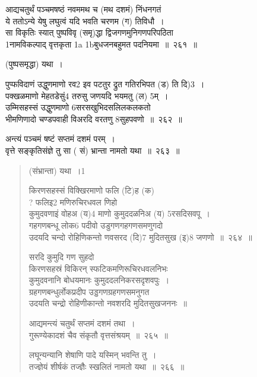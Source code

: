 \documentclass[11pt, openany]{book}
\begin{document}
\begin{quote}

\end{quote}
{\na आद्यचतुर्थं पञ्चमषष्ठं नवममथ च (मथ दशमं) निंधनगतं \\
ये ततोऽन्ये येषु लघुत्वं यदि भवति चरणम (ग) तिविधौ~।\\
सा विकृतिः स्यात् पुष्पविवृ (समृ)द्धा द्विजगणमुनिगणपरिपठिता\\
1नामविकल्पाद् वृत्तकृता 1a 1bबुधजनबहुमत पदनियमा~॥~२६१~॥}

(पुष्पसमृद्धा) यथा~। 

{\na पुप्फविदाणं उद्धुणमाणो रव2 इव पटतुर द्रुत गतिरभिपत (ड) ति दि)3~। \\
पक्खळमाणो मेहतडेसुं4 तरुसु जणयदि भयमतु (ल) 5म्~।\\
उम्मिसहस्सं उद्धुणमाणो 6सरसखुभिदसलिलकलकतो\\
भीमणिणादो चण्डपवाही विअरदि वरतणु 8सुहपवणो~॥~२६२~॥}

{} 

{\na अन्त्यं पञ्चमं षष्टं सप्तमं दशमं परम्~।\\
वृत्ते सङ्कृतिसंज्ञे तु सा ( सं) भ्रान्ता नामतो यथा~॥~२६३~॥}


\newpage

\begin{quote}
(संभ्रान्ता) यथा~।1 

{\na किरणसहस्सं विक्खिरमाणो फलि (टि)ह (क) \\
 ? फलिइ2 मणिरुचिरधवल णिहो\\
 कुमुदवणाइं वोहअ (य)4 माणो कुमुददळनिअ (य) 5रसदिसवपू~। \\
गहगणबन्धू लोक6 पदीवो उडुगणगहगणसमणुगदो \\
उदयदि चन्दो रोहिणिकन्तो णवसरद (दि)7 मुदितसुख (इ)8 जणणो~॥~२६४~॥}

{\qt सरदि कुमुदि गण सुहदो \\
किरणसहस्रं विकिरन् स्फटिकमणिरूचिरधवलनिभः \\
कुमुदवनानि बोधयमानः कुमुददलनिकरसदृशवपुः~। \\
ग्रहगणबन्धुर्लोकप्रदीप उड्डगणग्रहगणसमनुगत \\
उदयति चन्द्रो रोहिणीकान्तो नवशरदि मुदितसुखजननः~॥ }

{\na आद्यमन्त्यं चतुर्थं सप्तमं दशमं तथा~। \\
गुरूण्येकादशं चैव संकृतौ वृत्तसंश्रयम्~॥~२६५~॥

लघून्यन्यानि शेषाणि पादे यस्मिन् भवन्ति तु~। \\
तज्ज्ञेयं शीर्षकं तज्ज्ञैः स्खलितं नामतो यथा~॥~२६६~॥}
\end{quote}
\end{document}
